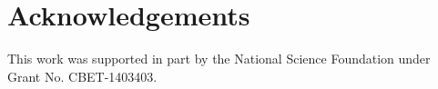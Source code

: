 \documentclass[preprint,12pt, a4paper]{elsarticle}
\begin{document}
\section*{Acknowledgements}
\label{acknowledgements}

This work was supported in part by the National Science Foundation under Grant No. CBET-1403403.




\end{document}
